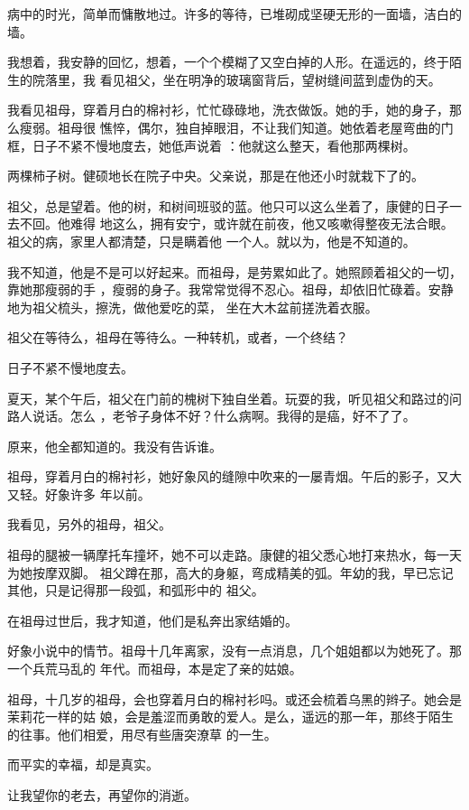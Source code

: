 \documentclass[12pt,a4paper]{article}
\begin{document}
		病中的时光，简单而慵散地过。许多的等待，已堆砌成坚硬无形的一面墙，洁白的墙。

		我想着，我安静的回忆，想着，一个个模糊了又空白掉的人形。在遥远的，终于陌生的院落里，我
	看见祖父，坐在明净的玻璃窗背后，望树缝间蓝到虚伪的天。

		我看见祖母，穿着月白的棉衬衫，忙忙碌碌地，洗衣做饭。她的手，她的身子，那么瘦弱。祖母很
	憔悴，偶尔，独自掉眼泪，不让我们知道。她依着老屋弯曲的门框，日子不紧不慢地度去，她低声说着
	：他就这么整天，看他那两棵树。

		两棵柿子树。健硕地长在院子中央。父亲说，那是在他还小时就栽下了的。

		祖父，总是望着。他的树，和树间班驳的蓝。他只可以这么坐着了，康健的日子一去不回。他难得
	地这么，拥有安宁，或许就在前夜，他又咳嗽得整夜无法合眼。祖父的病，家里人都清楚，只是瞒着他
	一个人。就以为，他是不知道的。

		我不知道，他是不是可以好起来。而祖母，是劳累如此了。她照顾着祖父的一切，靠她那瘦弱的手
	，瘦弱的身子。我常常觉得不忍心。祖母，却依旧忙碌着。安静地为祖父梳头，擦洗，做他爱吃的菜，
	坐在大木盆前搓洗着衣服。

		祖父在等待么，祖母在等待么。一种转机，或者，一个终结？

		日子不紧不慢地度去。

		夏天，某个午后，祖父在门前的槐树下独自坐着。玩耍的我，听见祖父和路过的问路人说话。怎么
	，老爷子身体不好？什么病啊。我得的是癌，好不了了。

		原来，他全都知道的。我没有告诉谁。

		祖母，穿着月白的棉衬衫，她好象风的缝隙中吹来的一屡青烟。午后的影子，又大又轻。好象许多
	年以前。

		我看见，另外的祖母，祖父。

		祖母的腿被一辆摩托车撞坏，她不可以走路。康健的祖父悉心地打来热水，每一天为她按摩双脚。
	祖父蹲在那，高大的身躯，弯成精美的弧。年幼的我，早已忘记其他，只是记得那一段弧，和弧形中的
	祖父。

		在祖母过世后，我才知道，他们是私奔出家结婚的。

		好象小说中的情节。祖母十几年离家，没有一点消息，几个姐姐都以为她死了。那一个兵荒马乱的
	年代。而祖母，本是定了亲的姑娘。

		祖母，十几岁的祖母，会也穿着月白的棉衬衫吗。或还会梳着乌黑的辫子。她会是茉莉花一样的姑
	娘，会是羞涩而勇敢的爱人。是么，遥远的那一年，那终于陌生的往事。他们相爱，用尽有些唐突潦草
	的一生。

		而平实的幸福，却是真实。\par
		让我望你的老去，再望你的消逝。
\end{document}
